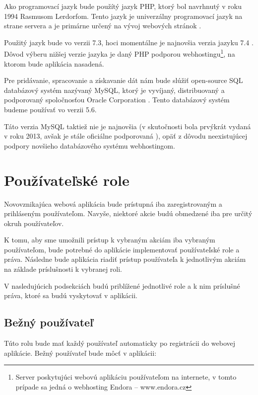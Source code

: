 Ako programovací jazyk bude použítý jazyk PHP, ktorý bol navrhnutý v roku 1994 Rasmusom Lerdorfom. Tento jazyk je univerzálny programovací jazyk na strane servera a je primárne určený na vývoj webových stránok \cite{co-je-php}.

Použitý jazyk bude vo verzii 7.3, hoci momentálne je najnovšia verzia jazyku 7.4 \cite{verzie-php}.
Dôvod výberu nižšej verzie jazyka je daný PHP podporou webhostingu\footnote{Server poskytujúci webovú aplikáciu používateľom na internete, v tomto prípade sa jedná o webhosting Endora -- www.endora.cz}, na ktorom bude aplikácia nasadená.

Pre pridávanie, spracovanie a získavanie dát nám bude slúžiť open-source SQL databázový systém nazývaný MySQL, ktorý je vyvíjaný, distribuovaný a podporovaný spoločnosťou Oracle Corporation \cite{co-je-mysql}. Tento databázový systém budeme používať vo verzii 5.6.

Táto verzia MySQL taktiež nie je najnovšia (v skutočnosti bola prvýkrát vydaná v roku 2013, avšak je stále oficiálne podporovaná \cite{verzie-mysql}), opäť z dôvodu neexistujúcej podpory novšieho databázového systému webhostingom.

\section{Používateľské role}\label{pouzivatelske-role}
Novovznikajúca webová aplikácia bude prístupná iba zaregistrovaným a prihláseným používateľom. Navyše, niektoré akcie budú obmedzené iba pre určitý okruh používateľov.

K tomu, aby sme umožnili prístup k vybraným akciám iba vybraným používateľom, bude potrebné do aplikácie implementovať používateľské role a práva. Následne bude aplikácia riadiť prístup používateľa k jednotlivým akciám na základe príslušnosti k vybranej roli.

V nasledujúcich podsekciách budú priblížené jednotlivé role a k nim príslušné práva, ktoré sa budú vyskytovať v aplikácii.

\subsection{Bežný používateľ}\label{bezny-pouzivatel}
Túto rolu bude mať každý používateľ automaticky po registrácii do webovej aplikácie. Bežný používateľ bude môcť v aplikácii: 

